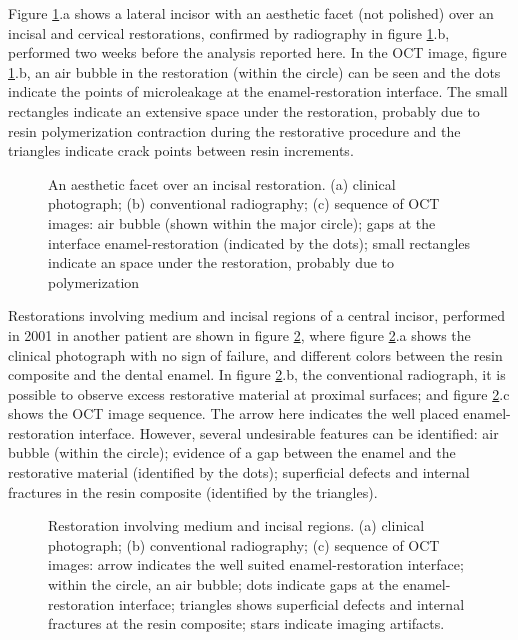 \documentclass[12pt,twoside,english]{book}
\renewcommand{\~}{\perispomeni}%
\numberwithin{equation}{section}
\numberwithin{figure}{section}
\begin{document}
Figure \ref{fig:aesthetic}.a shows a lateral incisor with an aesthetic facet (not polished) over an incisal and cervical restorations, confirmed by radiography in figure \ref{fig:aesthetic}.b, performed two weeks before the analysis reported here. In the OCT image, figure \ref{fig:aesthetic}.b, an air bubble in the restoration (within the circle) can be seen and the dots indicate the points of microleakage at the enamel-restoration interface. The small rectangles indicate an extensive space under the restoration, probably due to resin polymerization contraction during the restorative procedure and the triangles indicate crack points between resin increments.
\begin{figure}[h]
\noindent \begin{centering}
\caption{An aesthetic facet over an incisal restoration. (a) clinical photograph; (b) conventional radiography; (c) sequence of OCT images: air bubble (shown within the major circle); gaps at the interface enamel-restoration (indicated by the dots); small rectangles indicate an space under the restoration, probably due to polymerization\label{fig:aesthetic}}
\par\end{centering}
\end{figure}

Restorations involving medium and incisal regions of a central incisor, performed in 2001 in another patient are shown in figure \ref{fig:medium region}, where figure \ref{fig:medium region}.a shows the clinical photograph with no sign of failure, and different colors between the resin composite and the dental enamel. In figure \ref{fig:medium region}.b, the conventional radiograph, it is possible to observe excess restorative material at proximal surfaces; and figure \ref{fig:medium region}.c shows the OCT image sequence. The arrow here indicates the well placed enamel-restoration interface. However, several undesirable features can be identified: air bubble (within the circle); evidence of a gap between the enamel and the restorative material (identified by the dots); superficial defects and internal fractures in the resin composite (identified by the triangles).
\begin{figure}[h]
\noindent \centering{}
\caption{Restoration involving medium and incisal regions. (a) clinical photograph; (b) conventional radiography; (c) sequence of OCT images: arrow indicates the well suited enamel-restoration interface; within the circle, an air bubble; dots indicate gaps at the enamel-restoration interface; triangles shows superficial defects and internal fractures at the resin composite; stars indicate imaging artifacts.}
\label{fig:medium region}
\end{figure}
\end{document}
